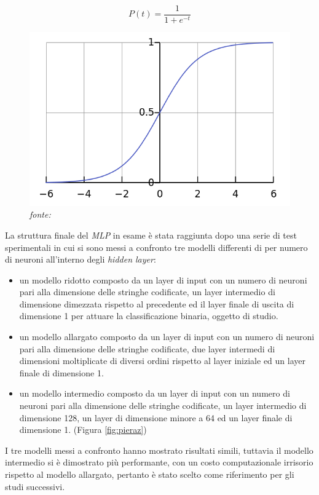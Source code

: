 \[P(t) = \frac{1}{1+e^{-t}}\]

\begin{figure}[htb]
    \centering
    \includegraphics[width=0.5\columnwidth]{figures/sigmoid.png}
    \caption{\textit{fonte:} \cite{fig:sigmoid}}
\label{fig:sigmoid}
\end{figure}

La struttura finale del \textit{MLP} in esame è stata raggiunta dopo una serie di test sperimentali in cui si sono messi a confronto tre modelli differenti di per numero di neuroni all'interno degli \textit{hidden layer}: 
\begin{itemize}
\item un modello ridotto composto da un layer di input con un numero di neuroni pari alla dimensione delle stringhe codificate, un layer intermedio di dimensione dimezzata rispetto al precedente ed il layer finale di uscita di dimensione 1 per attuare la classificazione binaria, oggetto di studio.

\item un modello allargato composto da un layer di input con un numero di neuroni pari alla dimensione delle stringhe codificate, due layer intermedi di dimensioni moltiplicate di diversi ordini rispetto al layer iniziale ed un layer finale di dimensione 1.

\item un modello intermedio composto da un layer di input con un numero di neuroni pari alla dimensione delle stringhe codificate, un layer intermedio di dimensione 128, un layer di dimensione minore a 64 ed un layer finale di dimensione 1. (Figura \ref{fig:pieraz})

\end{itemize}

I tre modelli messi a confronto hanno mostrato risultati simili, tuttavia  il modello intermedio si è dimostrato più performante, con un costo computazionale irrisorio rispetto al modello allargato, pertanto è stato scelto come riferimento per gli studi successivi.

